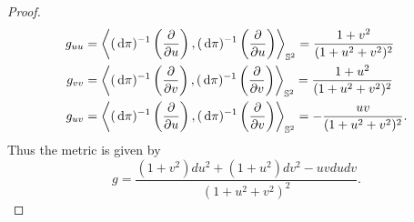 \documentclass{report}
\begin{document}
\begin{itemize}
\begin{proof}
\begin{align*}
        g_{uu} &= \left\langle (\,\mathrm{d} \pi)^{-1}\left(\frac{\partial}{\partial u}\right), (\,\mathrm{d} \pi)^{-1}\left(\frac{\partial}{\partial u}\right) \right\rangle_{\mathbb S^2} = \frac{1 + v^2}{(1 + u^2 + v^2)^2}\\
        g_{vv} &= \left\langle (\,\mathrm{d} \pi)^{-1}\left(\frac{\partial}{\partial v}\right), (\,\mathrm{d} \pi)^{-1}\left(\frac{\partial}{\partial v}\right) \right\rangle_{\mathbb S^2} = \frac{1 + u^2}{(1 + u^2 + v^2)^2}\\
        g_{uv} &= \left\langle (\,\mathrm{d} \pi)^{-1}\left(\frac{\partial}{\partial u}\right), (\,\mathrm{d} \pi)^{-1}\left(\frac{\partial}{\partial v}\right) \right\rangle_{\mathbb S^2} = - \frac{uv}{(1 + u^2 + v^2)^2}.
    \end{align*}
    Thus the metric is given by
    \[
    g = \frac{(1 + v^2) du^2 + (1 + u^2) dv^2 - uv du dv}{(1 + u^2 + v^2)^2}.
    \]
    \end{proof}
\end{itemize}
\end{document}
